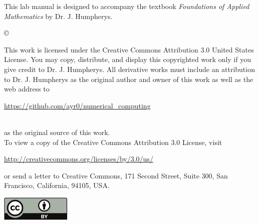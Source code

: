 \documentclass{newsiambook}
\begin{document}
\begin{thepreface}
This lab manual is designed to accompany the textbook \emph{Foundations of Applied Mathematics} by Dr. J. Humpherys.

\vfill
\copyright{This work is licensed under the Creative Commons Attribution 3.0 United States 
License.  You may copy, distribute, and display this copyrighted work only if you give 
credit to Dr. J. Humpherys. All derivative works must include an attribution to Dr. J. 
Humpherys as the original author and owner of this work as well as the web address to 
\\\centerline{\url{https://github.com/ayr0/numerical_computing}}\\ as the original source of 
this 
work.\\To view a copy of the Creative Commons Attribution 3.0 License, 
visit\\\centerline{\url{http://creativecommons.org/licenses/by/3.0/us/}} or send a letter to 
Creative Commons, 171 Second Street, Suite 300, San Francisco, California, 94105, USA.}

\vfill
\centering\includegraphics[height=1.2cm]{by}
\vfill
\end{thepreface}

\setcounter{tocdepth}{1}
\tableofcontents

\mainmatter


\begin{python}






\end{python}

\begin{matlab}






\end{matlab}
\end{document}
